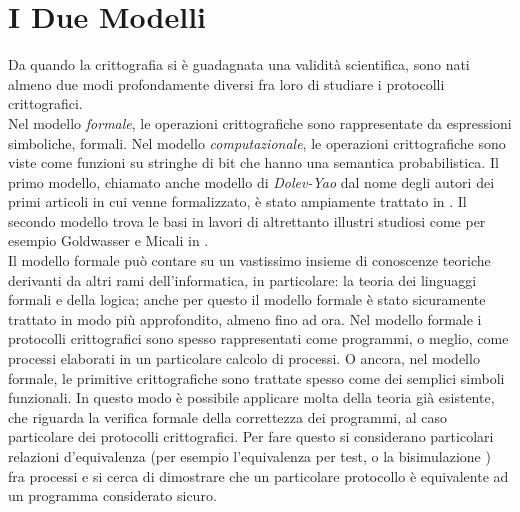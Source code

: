 \documentclass[a4paper,openright,twoside,12pt]{report}
\begin{document}
\section*{I Due Modelli}
Da quando la crittografia si \`e guadagnata una validit\`a scientifica, sono nati almeno due modi profondamente
 diversi fra loro di studiare i protocolli crittografici.\\Nel modello \emph{formale}, le operazioni crittografiche sono rappresentate da espressioni simboliche, formali.
Nel modello \emph{computazionale}, le operazioni crittografiche sono viste come funzioni su stringhe di bit che hanno una semantica probabilistica.
Il primo modello, chiamato anche modello di \emph{Dolev-Yao} dal nome degli autori dei primi articoli in cui venne formalizzato,
\`e stato ampiamente trattato in \cite{AbadiG99, BurrowsAN90, Kemmerer87, Paulson98}. 
Il secondo modello trova le basi in lavori di altrettanto illustri studiosi come per esempio Goldwasser e Micali in \cite{GoldwasserM84}.\\
Il modello formale pu\`o contare su un vastissimo insieme di conoscenze teoriche derivanti da altri rami dell'informatica, in particolare: la teoria dei linguaggi formali e della logica;
anche per questo il modello formale \`e stato sicuramente trattato in modo pi\`u approfondito, almeno fino ad ora. 
Nel modello formale i protocolli crittografici sono spesso rappresentati come programmi, o meglio, come processi elaborati
in un particolare calcolo di processi. O ancora, nel modello formale, le 
primitive crittografiche sono trattate spesso come dei semplici simboli funzionali. 
In questo modo \`e possibile applicare molta della teoria gi\`a esistente, 
che riguarda la verifica formale della correttezza dei programmi, al caso particolare dei protocolli crittografici.
Per fare questo si considerano particolari relazioni d'equivalenza (per esempio l'equivalenza per test, o la 
bisimulazione \cite{AbadiG99}) fra processi e si cerca di dimostrare che un particolare protocollo \`e equivalente ad un programma considerato sicuro.
\end{document}
